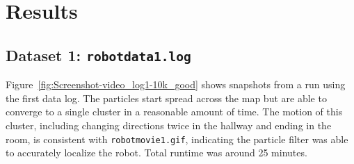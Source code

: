 \section{Results}

\subsection{Dataset 1: \texttt{robotdata1.log}}

Figure~\ref{fig:Screenshot-video_log1-10k_good} shows snapshots from a run using the first data log. The particles start spread across the map but are able to converge to a single cluster in a reasonable amount of time. The motion of this cluster, including changing directions twice in the hallway and ending in the room, is consistent with \texttt{robotmovie1.gif}, indicating the particle filter was able to accurately localize the robot. Total runtime was around 25 minutes.

